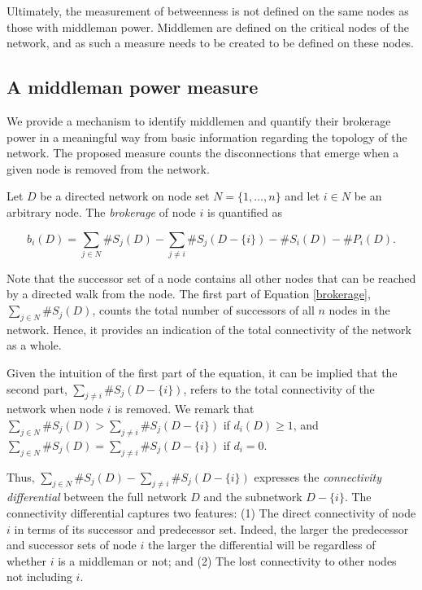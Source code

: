\documentclass[11pt,fleqn]{article}
\begin{document}
Ultimately, the measurement of betweenness is not defined on the same nodes as those with middleman power. Middlemen are defined on the critical nodes of the network, and as such a measure needs to be created to be defined on these nodes.

\subsection{A middleman power measure}

We provide a mechanism to identify middlemen and quantify their brokerage power in a meaningful way from basic information regarding the topology of the network. The proposed measure counts the disconnections that emerge when a given node is removed from the network.

Let $D$ be a directed network on node set $N = \{1, \ldots ,n\}$ and let $i \in N$ be an arbitrary node. The \emph{brokerage} of node $i$ is quantified as

\begin{equation} \label{brokerage}
b_{i}(D) = \sum_{j \in N} \# S_{j}(D) - \sum_{j \neq i} \# S_{j}(D - \{i\}) - \#S_{i}(D) - \#P_{i}(D) .
\end{equation}

Note that the successor set of a node contains all other nodes that can be reached by a directed walk from the node. The first part of Equation \ref{brokerage}, $\sum_{j \in N} \# S_{j}(D)$, counts the total number of successors of all $n$ nodes in the network. Hence, it provides an indication of the total connectivity of the network as a whole.

Given the intuition of the first part of the equation, it can be implied that the second part, $\sum_{j \neq i} \# S_{j}(D - \{i\})$, refers to the total connectivity of the network when node $i$ is removed. We remark that $\sum_{j \in N} \# S_{j}(D) > \sum_{j \neq i} \# S_{j}(D - \{i\})$ if $d_{i}(D) \geqslant 1$, and $\sum_{j \in N} \# S_{j}(D) = \sum_{j \neq i} \# S_{j}(D - \{i\})$ if $d_{i} = 0$.

Thus, $\sum_{j \in N} \# S_{j}(D) - \sum_{j \neq i} \# S_{j}(D - \{i\})$ expresses the \emph{connectivity differential} between the full network $D$ and the subnetwork $D - \{i\}$. The connectivity differential captures two features: (1) The direct connectivity of node $i$ in terms of its successor and predecessor set. Indeed, the larger the predecessor and successor sets of node $i$ the larger the differential will be regardless of whether $i$ is a middleman or not; and (2) The lost connectivity to other nodes not including $i$.
\end{document}
